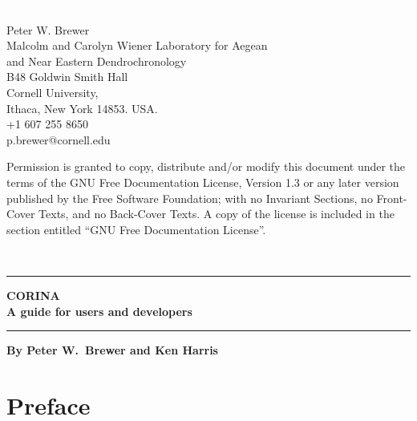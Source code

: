


\thispagestyle{empty} 
\includegraphics{Images/pixel.png}
\vfill
\parbox[b]{11cm}{\raggedright

 Peter W. Brewer\\ Malcolm and Carolyn Wiener Laboratory for Aegean\\ and Near Eastern Dendrochronology \\
B48 Goldwin Smith Hall\\ Cornell University, \\ Ithaca, New York 14853. USA.\\[0.5cm] \Telefon\hspace{3mm}+1 607 255 8650 \\ \Letter\hspace{3mm}p.brewer@cornell.edu\\[15mm]}

{\footnotesize 
Permission is granted to copy, distribute and/or modify this document
under the terms of the GNU Free Documentation License, Version 1.3
or any later version published by the Free Software Foundation;
with no Invariant Sections, no Front-Cover Texts, and no Back-Cover Texts.
A copy of the license is included in the section entitled ``GNU Free Documentation License''.}



\newpage
{}
\setcounter{page}{1}
\thispagestyle{empty} 
{ \includegraphics{Images/pixel.png}\\[4cm] 
\hrule 
\vspace{5mm}
\Huge \bfseries CORINA\\[3mm] 
\large{A guide for users and developers}
\vspace{5mm}
\hrule
\vspace{3cm}
}
{
\normalsize
\textbf{By Peter W.\ Brewer and Ken Harris}\\[0.6cm]


}

\newpage


\tableofcontents


\cleardoublepage
{} 

\section*{Preface}
\thispagestyle{empty} 


